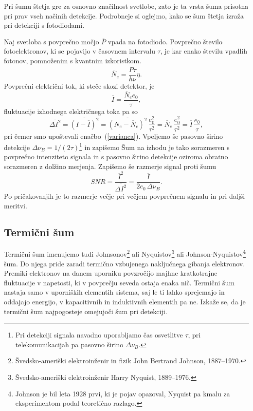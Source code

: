 Pri šumu štetja gre za osnovno značilnost svetlobe, zato je ta vrsta šuma
prisotna pri prav vseh načinih detekcije. Podrobneje si oglejmo, 
kako se šum štetja izraža pri detekciji s fotodiodami. 

Naj svetloba s povprečno močjo $\overline{P}$ vpada na fotodiodo.
Povprečno število fotoelektronov, ki se pojavijo v časovnem intervalu 
$\tau$, je kar enako številu vpadlih fotonov, pomnoženim 
s kvantnim izkoristkom. 
\begin{equation}
\overline{N}_e = \frac{\overline{P}\tau}{h \nu}\eta.
\end{equation}
Povprečni električni tok, ki steče skozi detektor, je  
\begin{equation}
\overline{I} = \frac{\overline{N}_e e_0}{\tau},
\end{equation}
fluktuacije izhodnega električnega toka pa so
\begin{equation}
\overline{\Delta I^2}=\overline{(I-\overline{I})^2} = \overline{(N_e-\overline{N}_e)^2}\,
\frac{e_0^2}{\tau^2} = \overline{N}_e\,\frac{e_0^2}{\tau^2}= \overline{I}\,\frac{e_0}{\tau},
\end{equation}
pri čemer smo upoštevali enačbo~(\ref{varianca}). Vpeljemo še pasovno širino 
detekcije $\Delta\nu_B = 1/(2\tau)$\footnote{Pri detekciji signala navadno uporabljamo
čas osvetlitve $\tau$, pri telekomunikacijah pa pasovno širino $\Delta\nu_B$.} 
in zapišemo
Šum na izhodu je tako sorazmeren s povprečno intenziteto signala in 
s pasovno širino detekcije oziroma obratno sorazmeren z dolžino 
merjenja. Zapišemo še razmerje signal proti šumu 
\begin{equation}
SNR = \frac{\overline{I}^2}{\overline{\Delta I^2}}= \frac{\overline{I}}
{2 e_0\, \Delta\nu_B}.
\label{SNRs}
\end{equation}
Po pričakovanjih je to razmerje večje pri večjem povprečnem signalu in pri daljši meritvi.

\subsection*{Termični šum} 
Termični šum 
imenujemo tudi Johnsonov\footnote{Švedsko-ameriški elektroinženir in fizik 
John Bertrand Johnson, 1887--1970.} ali Nyquistov\footnote{Švedsko-ameriški elektroinženir
Harry Nyquist, 1889--1976.} ali Johnson-Nyquistov\footnote{Johnson je bil leta 1928 prvi, 
ki je pojav opazoval, 
Nyquist pa kmalu za eksperimentom podal teoretično razlago.} šum. 
Do njega pride zaradi termično vzbujenega naključnega gibanja elektronov. Premiki elektronov
na danem uporniku povzročijo majhne kratkotrajne fluktuacije v napetosti, ki
v povprečju seveda ostaja enaka nič.  
Termični šum nastaja samo v uporniških elementih sistema, saj le ti lahko
sprejemajo in oddajajo energijo, v kapacitivnih in induktivnih elementih pa ne.
Izkaže se, da je termični šum najpogosteje omejujoči šum pri detekciji.

